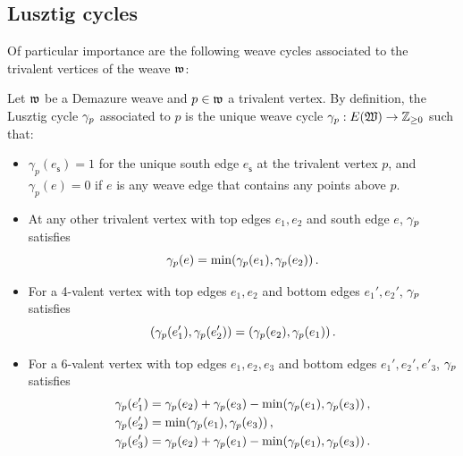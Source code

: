 \subsection{Lusztig cycles}\label{sssec:Lusztigcycles} Of particular importance are the following weave cycles associated to the trivalent vertices of the weave $\mathfrak{w}$:

\begin{definition}\label{def:Lusztig_cycles}
Let $\mathfrak{w}$ be a Demazure weave and $p\in\mathfrak{w}$ a trivalent vertex. By definition, the Lusztig cycle $\gamma_p$ associated to $p$ is the unique weave cycle $\gamma_p: E(\mathfrak{W}) \to \mathbb{Z}_{\ge 0}$ such that:
\begin{itemize}
    \item[$(i)$] $\gamma_p(e_\mathsf{s})=1$ for the unique south edge $e_\mathsf{s}$ at the trivalent vertex $p$, and $\gamma_p(e)=0$ if $e$ is any weave edge that contains any points above $p$.\\
    
    \item[$(ii)$] At any other trivalent vertex with top edges $e_1,e_2$ and south edge $e$, $\gamma_p$ satisfies
    \begin{equation}\gamma_p(e)=\min(\gamma_p(e_1),\gamma_p(e_2))\,.\label{eq:3_move}\end{equation}
    
    \item[$(iii)$] For a 4-valent vertex  with top edges $e_1,e_2$ and  bottom edges $e_1',e_2'$, $\gamma_p$ satisfies
    \[(\gamma_p(e'_1),\gamma_p(e'_2))=(\gamma_p(e_2),\gamma_p(e_1))\,.\]
    
    \item[$(iv)$] For a 6-valent vertex  with top edges $e_1,e_2,e_3$ and bottom edges $e_1',e_2',e'_3$, $\gamma_p$ satisfies
    \begin{align*}
        \gamma_p(e'_1) & = \gamma_p(e_2)+\gamma_p(e_3)-\min(\gamma_p(e_1),\gamma_p(e_3))\,,\\
        \gamma_p(e'_2) & = \min(\gamma_p(e_1),\gamma_p(e_3))\,,\\
        \gamma_p(e'_3) & = \gamma_p(e_2)+\gamma_p(e_1)-\min(\gamma_p(e_1),\gamma_p(e_3))\,.
    \end{align*}
\end{itemize}
\sbs
\end{definition}

